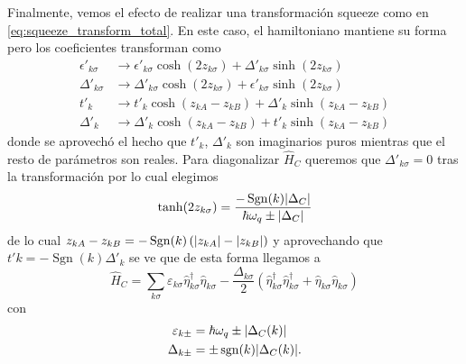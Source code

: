 Finalmente, vemos el efecto de realizar una transformación squeeze como en \eqref{eq:squeeze_transform_total}. En este caso, el hamiltoniano mantiene su forma pero los coeficientes transforman como 
\begin{subequations}
  \begin{align}
    \epsilon'_{k\sigma}&\rightarrow \epsilon'_{k\sigma} \cosh(2z_{k\sigma}) + \Delta'_{k\sigma}\sinh(2z_{k\sigma})\\
    \Delta'_{k\sigma}&\rightarrow \Delta'_{k\sigma} \cosh(2z_{k\sigma}) + \epsilon'_{k\sigma}\sinh(2z_{k\sigma})\\
    t'_k &\rightarrow t'_k \cosh(z_{kA} - z_{kB}) + \Delta'_k \sinh(z_{kA} - z_{kB})\\ 
    \Delta'_k &\rightarrow \Delta'_k \cosh(z_{kA} - z_{kB}) + t'_k \sinh(z_{kA} - z_{kB})
  \end{align}
\end{subequations}
donde se aprovechó el hecho que $t'_k$, $\Delta'_k$ son imaginarios puros mientras que el resto de parámetros son reales. Para diagonalizar $\hat H_C$ queremos que $\Delta'_{k\sigma} = 0$ tras la transformación por lo cual elegimos
\begin{equation}
  \tanh(2z_{k\sigma}) = \frac{-\operatorname{Sgn}(k)\abs{\Delta_C}}{\hbar \omega_q \pm \abs{\Delta_C}}
\end{equation}
de lo cual $z_{kA}-z_{kB} = -\operatorname{Sgn}(k)\left(\abs{z_{kA}} - \abs{z_{kB}}\right)$ y aprovechando que $t'k = -\operatorname{Sgn}(k)\Delta'_k$ se ve que
   de esta forma llegamos a
\begin{equation}
    \hat H_C = \sum_{k\sigma}\varepsilon_{k\sigma} \hat \eta_{k\sigma}^\dag \hat \eta_{k\sigma} - \frac{\Delta_{k\sigma}}{2}\left(\hat \eta^\dag_{k\sigma}\hat \eta^\dag_{k\sigma} + \hat \eta_{k\sigma}\hat \eta_{k\sigma}\right)\label{eq:semi_diagonalized_Hc}
\end{equation}
con 
\begin{subequations}
    \begin{align}
        \varepsilon_{k\pm} &= \hbar \omega_q \pm \abs{\Delta_C(k)}\\
        \Delta_{k\pm} &= \pm \operatorname{sgn}(k)\abs{\Delta_C(k)}.
    \end{align}
\end{subequations}

